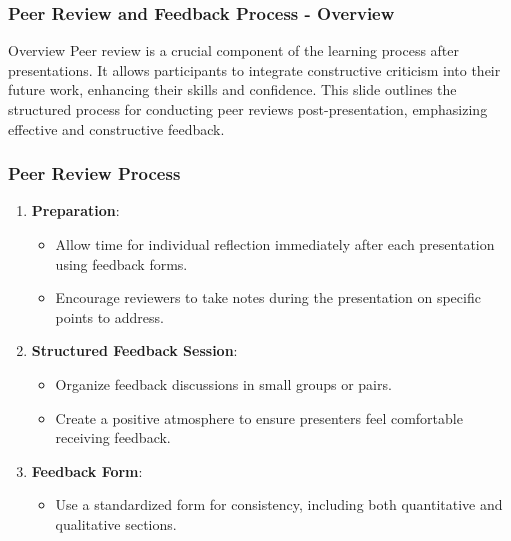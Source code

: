\documentclass[aspectratio=169]{beamer}
\begin{document}
\begin{frame}[fragile]
    \frametitle{Peer Review and Feedback Process - Overview}
    \begin{block}{Overview}
        Peer review is a crucial component of the learning process after presentations. It allows participants to integrate constructive criticism into their future work, enhancing their skills and confidence. This slide outlines the structured process for conducting peer reviews post-presentation, emphasizing effective and constructive feedback.
    \end{block}
\end{frame}

\begin{frame}[fragile]
    \frametitle{Peer Review Process}
    \begin{enumerate}
        \item \textbf{Preparation}:
            \begin{itemize}
                \item Allow time for individual reflection immediately after each presentation using feedback forms.
                \item Encourage reviewers to take notes during the presentation on specific points to address.
            \end{itemize}
        \item \textbf{Structured Feedback Session}:
            \begin{itemize}
                \item Organize feedback discussions in small groups or pairs.
                \item Create a positive atmosphere to ensure presenters feel comfortable receiving feedback.
            \end{itemize}
        \item \textbf{Feedback Form}:
            \begin{itemize}
                \item Use a standardized form for consistency, including both quantitative and qualitative sections.
            \end{itemize}
    \end{enumerate}
\end{frame}
\end{document}
